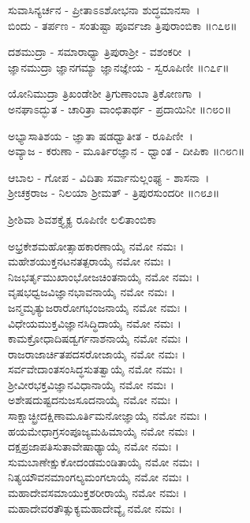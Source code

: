 ಸುವಾಸಿನ್ಯರ್ಚನ - ಪ್ರೀತಾಽಽಶೋಭನಾ ಶುದ್ಧಮಾನಸಾ~।\\
ಬಿಂದು - ತರ್ಪಣ - ಸಂತುಷ್ಟಾ ಪೂರ್ವಜಾ ತ್ರಿಪುರಾಂಬಿಕಾ ॥೧೭೮॥

ದಶಮುದ್ರಾ - ಸಮಾರಾಧ್ಯಾ ತ್ರಿಪುರಾಶ್ರೀ - ವಶಂಕರೀ~।\\
ಜ್ಞಾನಮುದ್ರಾ ಜ್ಞಾನಗಮ್ಯಾ ಜ್ಞಾನಜ್ಞೇಯ - ಸ್ವರೂಪಿಣೀ ॥೧೭೯॥

ಯೋನಿಮುದ್ರಾ ತ್ರಿಖಂಡೇಶೀ ತ್ರಿಗುಣಾಂಬಾ ತ್ರಿಕೋಣಗಾ~।\\
ಅನಘಾಽದ್ಭುತ - ಚಾರಿತ್ರಾ ವಾಂಛಿತಾರ್ಥ - ಪ್ರದಾಯಿನೀ ॥೧೮೦॥

ಅಭ್ಯಾಸಾತಿಶಯ - ಜ್ಞಾತಾ ಷಡಧ್ವಾತೀತ - ರೂಪಿಣೀ~।\\
ಅವ್ಯಾಜ - ಕರುಣಾ - ಮೂರ್ತಿರಜ್ಞಾನ - ಧ್ವಾಂತ - ದೀಪಿಕಾ ॥೧೮೧॥

ಆಬಾಲ - ಗೋಪ - ವಿದಿತಾ ಸರ್ವಾನುಲ್ಲಂಘ್ಯ - ಶಾಸನಾ~।\\
ಶ್ರೀಚಕ್ರರಾಜ - ನಿಲಯಾ ಶ್ರೀಮತ್ - ತ್ರಿಪುರಸುಂದರೀ ॥೧೮೨॥

ಶ್ರೀಶಿವಾ ಶಿವಶಕ್ತ್ಯೈಕ್ಯ  ರೂಪಿಣೀ ಲಲಿತಾಂಬಿಕಾ

ಅಭ್ರಕೇಶಮಹೋತ್ಸಾಹಕಾರಣಾಯೈ ನಮೋ ನಮಃ ।\\
ಮಹೇಶಯುಕ್ತನಟನತತ್ಪರಾಯೈ ನಮೋ ನಮಃ ।\\
ನಿಜಭರ್ತೃಮುಖಾಂಭೋಜಚಿಂತನಾಯೈ ನಮೋ ನಮಃ ।\\
ವೃಷಭಧ್ವಜವಿಜ್ಞಾನಭಾವನಾಯೈ ನಮೋ ನಮಃ ।\\
ಜನ್ಮಮೃತ್ಯುಜರಾರೋಗಭಂಜನಾಯೈ ನಮೋ ನಮಃ ।\\
ವಿಧೇಯಮುಕ್ತವಿಜ್ಞಾನಸಿದ್ಧಿದಾಯೈ ನಮೋ ನಮಃ ।\\
ಕಾಮಕ್ರೋಧಾದಿಷಡ್ವರ್ಗನಾಶನಾಯೈ ನಮೋ ನಮಃ ।\\
ರಾಜರಾಜಾರ್ಚಿತಪದಸರೋಜಾಯೈ ನಮೋ ನಮಃ ।\\
ಸರ್ವವೇದಾಂತಸಂಸಿದ್ಧಸುತತ್ವಾಯೈ ನಮೋ ನಮಃ ।\\
ಶ್ರೀವೀರಭಕ್ತವಿಜ್ಞಾನವಿಧಾನಾಯೈ ನಮೋ ನಮಃ ।\\
ಅಶೇಷದುಷ್ಟದನುಜಸೂದನಾಯೈ ನಮೋ ನಮಃ ।\\
ಸಾಕ್ಷಾಚ್ಛ್ರೀದಕ್ಷಿಣಾಮೂರ್ತಿಮನೋಜ್ಞಾಯೈ ನಮೋ ನಮಃ ।\\
ಹಯಮೇಧಾಗ್ರಸಂಪೂಜ್ಯಮಹಿಮಾಯೈ ನಮೋ ನಮಃ ।\\
ದಕ್ಷಪ್ರಜಾಪತಿಸುತಾವೇಷಾಢ್ಯಾಯೈ ನಮೋ ನಮಃ ।\\
ಸುಮಬಾಣೇಕ್ಷುಕೋದಂಡಮಂಡಿತಾಯೈ ನಮೋ ನಮಃ ।\\
ನಿತ್ಯಯೌವನಮಾಂಗಲ್ಯಮಂಗಲಾಯೈ ನಮೋ ನಮಃ ।\\
ಮಹಾದೇವಸಮಾಯುಕ್ತಶರೀರಾಯೈ ನಮೋ ನಮಃ ।\\
ಮಹಾದೇವರತೌತ್ಸುಕ್ಯಮಹಾದೇವ್ಯೈ ನಮೋ ನಮಃ ।


